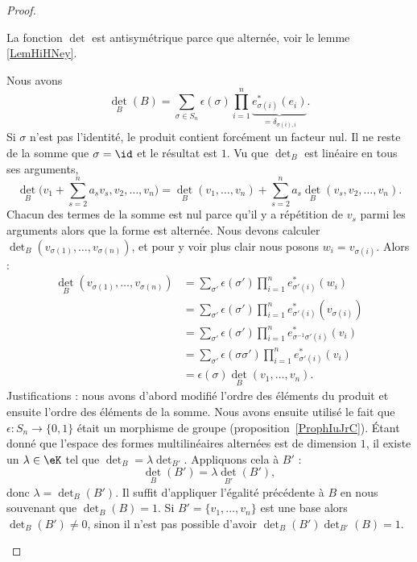 \begin{proof}
\begin{subproof}
		La fonction \( \det\) est antisymétrique parce que alternée, voir le lemme \ref{LemHiHNey}.

		\spitem[\ref{ITEMooNFJTooTqGoPr}]
		Nous avons
		\begin{equation}
			\det_B(B)=\sum_{\sigma\in S_n}\epsilon(\sigma)\prod_{i=1}^n\underbrace{e_{\sigma(i)}^*(e_i)}_{=\delta_{\sigma(i),i}}.
		\end{equation}
		Si \( \sigma\) n'est pas l'identité, le produit contient forcément un facteur nul. Il ne reste de la somme que \( \sigma=\id\) et le résultat est \( 1\).
		\spitem[\ref{ITEMooALRQooDvBzDQ}]
		Vu que \( \det_B\) est linéaire en tous ses arguments,
		\begin{equation}
			\det_B\big( v_1+\sum_{s=2}^na_sv_s,v_2,\ldots, v_n \big)=\det_B(v_1,\ldots, v_n)+\sum_{s=2}^na_s\det_B(v_s,v_2,\ldots, v_n).
		\end{equation}
		Chacun des termes de la somme est nul parce qu'il y a répétition de \( v_s\) parmi les arguments alors que la forme est alternée.
		\spitem[\ref{ITEMooQTTRooMbzqyW}]
		Nous devons calculer \( \det_B(v_{\sigma(1)},\ldots, v_{\sigma(n)})\), et pour y voir plus clair nous posons \( w_i=v_{\sigma(i)}\). Alors :
		\begin{subequations}
			\begin{align}
				\det_B(v_{\sigma(1)},\ldots, v_{\sigma(n)}) & =\sum_{\sigma'}\epsilon(\sigma')\prod_{i=1}^ne^*_{\sigma'(i)}(w_i)            \\
				                                            & =\sum_{\sigma'}\epsilon(\sigma')\prod_{i=1}^ne^*_{\sigma'(i)}(v_{\sigma(i)})  \\
				                                            & =\sum_{\sigma'}\epsilon(\sigma')\prod_{i=1}^ne^*_{\sigma^{-1}\sigma'(i)}(v_i) \\
				                                            & =\sum_{\sigma'}\epsilon(\sigma\sigma')\prod_{i=1}^ne^*_{\sigma'(i)}(v_i)      \\
				                                            & =\epsilon(\sigma)\det_B(v_1,\ldots, v_n).
			\end{align}
		\end{subequations}
		Justifications : nous avons d'abord modifié l'ordre des éléments du produit et ensuite l'ordre des éléments de la somme. Nous avons ensuite utilisé le fait que \( \epsilon\colon S_n\to \{ 0,1 \}\) était un morphisme de groupe (proposition~\ref{ProphIuJrC}).
		\spitem[\ref{ITEMooIPIDooTrerVF}]
		Étant donné que l'espace des formes multilinéaires alternées est de dimension \( 1\), il existe un \( \lambda\in \eK\) tel que \( \det_B=\lambda\det_{B'}\). Appliquons cela à \( B'\) :
		\begin{equation}
			\det_B(B')=\lambda\det_{B'}(B'),
		\end{equation}
		donc \( \lambda=\det_B(B')\).
		\spitem[\ref{ITEMooXKTAooXynFTE}]
		Il suffit d'appliquer l'égalité précédente à \( B\) en nous souvenant que \( \det_B(B)=1\).
		\spitem[\ref{ItemDWFLooDUePAf}]
		Si \( B'=\{ v_1,\ldots, v_n \}\) est une base alors \( \det_B(B')\neq 0\), sinon il n'est pas possible d'avoir \( \det_B(B')\det_{B'}(B)=1\).


\end{subproof}
\end{proof}
